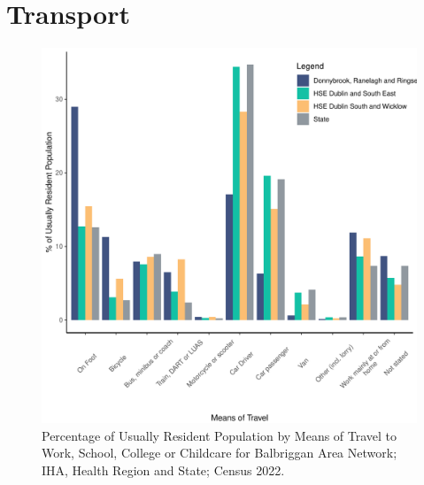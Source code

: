 \documentclass{article}
\begin{document}
\section{Transport}\label{sect:Trans}
\begin{figure}[H]
	\centering
	\includegraphics[width = 120mm]{../figures/TravelED.pdf}
	\caption{Percentage of Usually Resident Population by Means of Travel to Work, School, College or Childcare for Balbriggan Area Network; IHA, Health Region and State; Census 2022.}
	\label{fig:vbnv}
	\end{figure}
\end{document}
